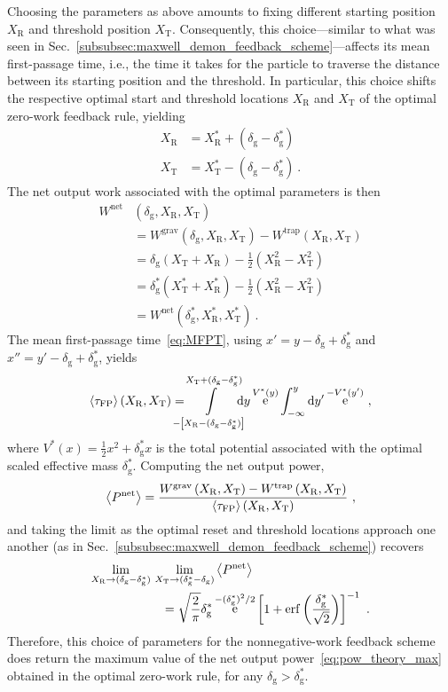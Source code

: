 \documentclass[%
reprint,
bibnotes, amsmath, amssymb, aps, pre,
 showkeys,
floatfix
]{revtex4-2}
\newcommand{\mrm}{\mathrm}
\newcommand{\pr}[1]{\left(#1\right)} %
\newcommand{\sr}[1]{\left[#1\right]} %
\newcommand{\dg}{\delta_{\mrm{g}}}
\newcommand{\wt}{W^{\mrm{trap}}}
\newcommand{\wg}{W^{\mrm{grav}}}
\newcommand{\wn}{W^{\mrm{net}}}
\newcommand{\epn}{\ev{P^{\mrm{net}}}}
\newcommand{\xT}{X_{\mrm{T}}}
\newcommand{\xR}{X_{\mrm{R}}}
\newcommand{\tmfp}{\ev{\tau_{\mrm{FP}}}}
\DeclareMathOperator{\e}{e}
\begin{document}
Choosing the parameters as above amounts to fixing different starting position $\xR$ and threshold position $\xT$. 
Consequently, this choice---similar to what was seen in Sec.~\ref{subsubsec:maxwell_demon_feedback_scheme}---affects its mean first-passage time, i.e., the time it takes for the particle to traverse the distance between its starting position and the threshold.
In particular, this choice shifts the respective optimal start and threshold locations $\xR$ and $\xT$ of the optimal zero-work feedback rule, yielding
\begin{subequations}
    \begin{align}
        \xR &= \xR^{*} + (\dg - \dg^{*}) \\
        \xT &= \xT^{*} - (\dg - \dg^{*}) \ .
    \end{align}
\end{subequations}
The net output work associated with the optimal parameters is then
\begin{subequations}
    \begin{align}
        \wn&\pr{\dg,\xR,\xT} \nonumber \\
        &= \wg\pr{\dg,\xR, \xT} - \wt\pr{\xR, \xT}\\
        &= \dg\pr{\xT+\xR} - \frac{1}{2}\pr{\xR^{2}-\xT^{2}}\\
        &= \dg^{*}\pr{\xT^{*}+\xR^{*}} - \frac{1}{2}
        \pr{\xR^{2}-\xT^{2}}\\
        &= \wn\pr{\dg^{*},\xR^{*},\xT^{*}}\ .
    \end{align}
\end{subequations}
The mean first-passage time~\eqref{eq:MFPT}, using $x' = y - \dg + \dg^{*}$ and $x'' = y'-\dg+\dg^{*}$, yields~\cite{Hanggi1990,Pontryagin1933} 
\begin{align}
    \tmfp\pr{\xR,\xT} = \mkern-18mu\int\limits_{-\sr{\xR-(\dg-\dg^{*})}}^{\xT+(\dg-\dg^{*})}\mkern-18mu\dd{y}\e^{V^{*}(y)}\int_{-\infty}^{y}\dd{y'}\e^{-V^{*}(y')}\ ,
\end{align}
where $V^{*}(x) = \frac{1}{2}x^{2} + \dg^{*}x$ is the total potential associated with the optimal scaled effective mass $\dg^{*}$. 
Computing the net output power, 
\begin{align}
    \epn = \frac{\wg\pr{\xR,\xT}-\wt\pr{\xR,\xT}}{\tmfp\pr{\xR,\xT}}\ ,
\end{align}
and taking the limit as the optimal reset and threshold locations approach one another (as in Sec.~\ref{subsubsec:maxwell_demon_feedback_scheme}) recovers 
\begin{align}
    \lim_{\xR\to(\dg-\dg^{*})}\, \lim_{\xT\to(\dg^{*}-\dg)}&\epn \\
    &\hspace{-1.5cm}= \sqrt{\frac{2}{\pi}}\dg^{*}\e^{-(\dg^{*})^{2}/2}\sr{1+\erf\pr{\frac{\dg^{*}}{\sqrt{2}}}}^{-1}\ .\nonumber
\end{align}
Therefore, this choice of parameters for the nonnegative-work feedback scheme does return the maximum value of the net output power~\eqref{eq:pow_theory_max} obtained in the optimal zero-work rule, for any $\dg > \dg^{*}$. 
\end{document}
